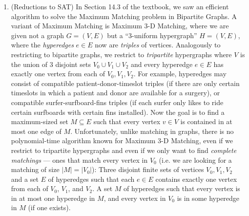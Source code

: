\documentclass[11pt]{article}
\begin{document}
\begin{enumerate}
\item (Reductions to SAT) In Section 14.3 of the textbook, we saw an efficient algorithm to solve the Maximum Matching problem in Bipartite Graphs. A variant of Maximum Matching is Maximum 3-D Matching, where we are given not a graph $G=(V,E)$ but a ``3-uniform hypergraph'' $H=(V,E)$, where the {\em hyperedges} $e\in E$ now are {\em triples} of vertices.
Analogously to restricting to bipartite graphs, we restrict to {\em tripartite} hypergraphs where $V$ is the union of 3 disjoint sets $V_0\cup V_1 \cup V_2$ and every hyperedge $e\in E$ has exactly one vertex from each of $V_0,V_1,V_2$. For example, hyperedges may consist of
compatible patient-donor-timeslot triples (if there are only certain timeslots in which a patient and donor are available for a surgery),
or compatible surfer-surfboard-fins triples (if each surfer only likes to ride certain surfboards with certain fins installed).
Now the goal is to find a maximum-sized set $M\subseteq E$ such that every vertex $v\in V$ is contained in at most one edge of $M$.
Unfortunately, unlike matching in graphs, there is no polynomial-time algorithm known for Maximum 3-D Matching, even if we restrict to tripartite hypergraphs and even if we only want to find {\em complete matchings} --- ones that match every vertex in $V_0$ (i.e. we are looking for a matching of size $|M|=|V_0|$):
{Three disjoint finite sets of vertices $V_0,V_1,V_2$ and a set $E$ of hyperedges  such that each $e\in E$ contains exactly one vertex from each of $V_0$, $V_1$, and $V_2$.}
{A set $M$ of hyperedges such that every vertex is in at most one hyperedge in $M$, and every vertex in $V_0$ is in some hyperedge in $M$ (if one exists).
}

\begin{figure}[h]
\centering
{}
\end{figure}
\end{enumerate}
\end{document}
